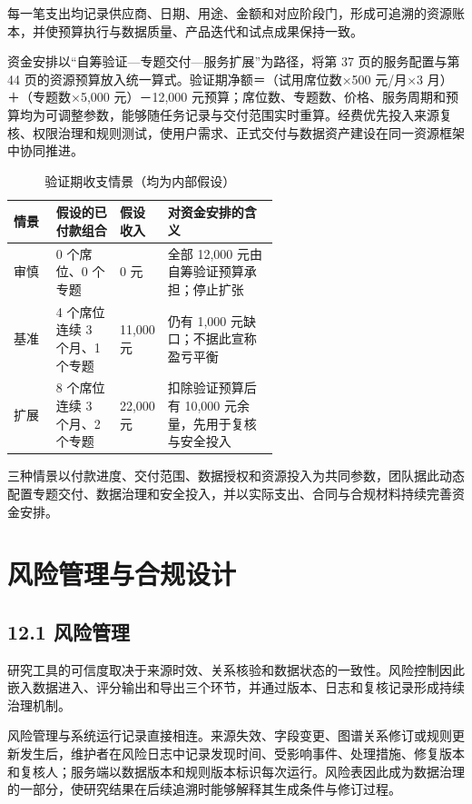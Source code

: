 每一笔支出均记录供应商、日期、用途、金额和对应阶段门，形成可追溯的资源账本，并使预算执行与数据质量、产品迭代和试点成果保持一致。


资金安排以“自筹验证—专题交付—服务扩展”为路径，将第 37 页的服务配置与第 44 页的资源预算放入统一算式。验证期净额＝（试用席位数×500 元/月×3 月）＋（专题数×5,000 元）－12,000 元预算；席位数、专题数、价格、服务周期和预算均为可调整参数，能够随任务记录与交付范围实时重算。经费优先投入来源复核、权限治理和规则测试，使用户需求、正式交付与数据资产建设在同一资源框架中协同推进。

\begin{table}[!htbp]
\centering
\caption{验证期收支情景（均为内部假设）}
\label{tab:wty-finance-scenarios}
\small
\begin{tabularx}{\linewidth}{p{0.16\linewidth}p{0.24\linewidth}p{0.18\linewidth}X}
\toprule
情景 & 假设的已付款组合 & 假设收入 & 对资金安排的含义 \\
\midrule
审慎 & 0 个席位、0 个专题 & 0 元 & 全部 12,000 元由自筹验证预算承担；停止扩张 \\
基准 & 4 个席位连续 3 个月、1 个专题 & 11,000 元 & 仍有 1,000 元缺口；不据此宣称盈亏平衡 \\
扩展 & 8 个席位连续 3 个月、2 个专题 & 22,000 元 & 扣除验证预算后有 10,000 元余量，先用于复核与安全投入 \\
\bottomrule
\end{tabularx}
\end{table}

三种情景以付款进度、交付范围、数据授权和资源投入为共同参数，团队据此动态配置专题交付、数据治理和安全投入，并以实际支出、合同与合规材料持续完善资金安排。


\section{风险管理与合规设计}
\subsection*{12.1 风险管理}\label{page:46}

研究工具的可信度取决于来源时效、关系核验和数据状态的一致性。风险控制因此嵌入数据进入、评分输出和导出三个环节，并通过版本、日志和复核记录形成持续治理机制。

风险管理与系统运行记录直接相连。来源失效、字段变更、图谱关系修订或规则更新发生后，维护者在风险日志中记录发现时间、受影响事件、处理措施、修复版本和复核人；服务端以数据版本和规则版本标识每次运行。风险表因此成为数据治理的一部分，使研究结果在后续追溯时能够解释其生成条件与修订过程。

